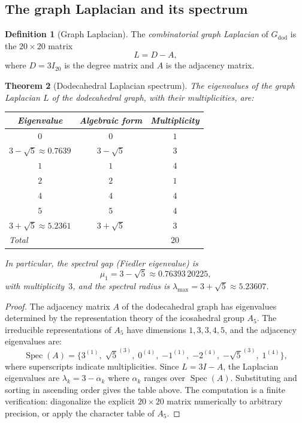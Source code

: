 \documentclass[12pt,a4paper]{article}
\newtheorem{theorem}{Theorem}[section]
\theoremstyle{definition}
\newtheorem{definition}[theorem]{Definition}
\theoremstyle{remark}
\newcommand{\Spec}{\operatorname{Spec}}
\begin{document}
\subsection{The graph Laplacian and its spectrum}\label{ssec:spectrum}

\begin{definition}[Graph Laplacian]\label{def:laplacian}
The \emph{combinatorial graph Laplacian} of $G_{\mathrm{dod}}$ is the
$20 \times 20$ matrix
\[
  L = D - A,
\]
where $D = 3I_{20}$ is the degree matrix and $A$ is the adjacency matrix.
\end{definition}

\begin{theorem}[Dodecahedral Laplacian spectrum]\label{thm:dodspec}
The eigenvalues of the graph Laplacian $L$ of the dodecahedral graph, with
their multiplicities, are:
\begin{center}
\begin{tabular}{ccc}
\toprule
\textbf{Eigenvalue} & \textbf{Algebraic form} & \textbf{Multiplicity} \\
\midrule
$0$                                 & $0$             & $1$ \\
$3 - \sqrt{5} \approx 0.7639$      & $3-\sqrt{5}$    & $3$ \\
$1$                                 & $1$             & $4$ \\
$2$                                 & $2$             & $1$ \\
$4$                                 & $4$             & $4$ \\
$5$                                 & $5$             & $4$ \\
$3 + \sqrt{5} \approx 5.2361$      & $3+\sqrt{5}$    & $3$ \\
\midrule
\multicolumn{2}{l}{\textit{Total}} & $20$ \\
\bottomrule
\end{tabular}
\end{center}
In particular, the spectral gap (Fiedler eigenvalue) is
\begin{equation}\label{eq:fiedler}
  \mu_1 = 3 - \sqrt{5} \approx 0.76393\,20225,
\end{equation}
with multiplicity~$3$, and the spectral radius is
$\lambda_{\max} = 3 + \sqrt{5} \approx 5.23607$.
\end{theorem}

\begin{proof}
The adjacency matrix $A$ of the dodecahedral graph has eigenvalues
determined by the representation theory of the icosahedral group $A_5$.
The irreducible representations of $A_5$ have dimensions $1, 3, 3, 4, 5$,
and the adjacency eigenvalues are:
\[
  \Spec(A) = \{3^{(1)},\; \sqrt{5}^{(3)},\; 0^{(4)},\; {-1}^{(1)},\;
  {-2}^{(4)},\; {-\sqrt{5}}^{(3)},\; 1^{(4)}\},
\]
where superscripts indicate multiplicities.  Since $L = 3I - A$, the
Laplacian eigenvalues are $\lambda_k = 3 - \alpha_k$ where $\alpha_k$
ranges over $\Spec(A)$.  Substituting and sorting in ascending order gives
the table above.  The computation is a finite verification: diagonalize the
explicit $20 \times 20$ matrix numerically to arbitrary precision, or apply
the character table of $A_5$.
\end{proof}
\end{document}
